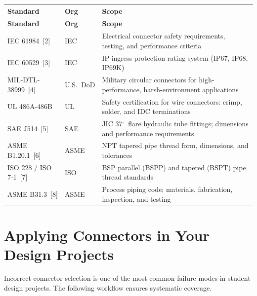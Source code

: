 \documentclass[11pt,letterpaper,twoside,openany]{book}
\begin{document}
\begin{longtable}{l l p{7.5cm}}
  \toprule
  \textbf{Standard} & \textbf{Org} & \textbf{Scope} \\
  \midrule
  \endfirsthead
  \toprule
  \textbf{Standard} & \textbf{Org} & \textbf{Scope} \\
  \midrule
  \endhead
  IEC 61984~[2] & IEC & Electrical connector safety requirements, testing, and performance criteria \\
  IEC 60529~[3] & IEC & IP ingress protection rating system (IP67, IP68, IP69K) \\
  MIL-DTL-38999~[4] & U.S.\ DoD & Military circular connectors for high-performance, harsh-environment applications \\
  UL 486A-486B & UL & Safety certification for wire connectors: crimp, solder, and IDC terminations \\
  SAE J514~[5] & SAE & JIC 37$^{\circ}$\ flare hydraulic tube fittings; dimensions and performance requirements \\
  ASME B1.20.1~[6] & ASME & NPT tapered pipe thread form, dimensions, and tolerances \\
  ISO 228 / ISO 7-1~[7] & ISO & BSP parallel (BSPP) and tapered (BSPT) pipe thread standards \\
  ASME B31.3~[8] & ASME & Process piping code; materials, fabrication, inspection, and testing \\
  \bottomrule
\end{longtable}


\section{Applying Connectors in Your Design Projects}

Incorrect connector selection is one of the most common failure modes in student design projects. The following workflow ensures systematic coverage.
\end{document}
